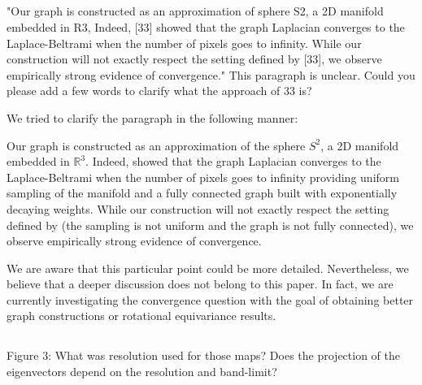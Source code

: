 \documentclass[12pt,a4paper]{article}
\newcommand{\todo}[1]{{\color[rgb]{.6,.1,.6}{TODO: #1}}}
\newcommand{\1}{\b{1}}              %
\newcommand{\0}{\b{0}}              %
\begin{document}
\todo{Assigned to: @all whoever can answer this question. I just do not know the answer.

We clarified the sentence with this:
\begin{mdframed}[style=manuscript]
blabla
\end{mdframed}
}

\subsection{}
\begin{mdframed}[style=comment]
"Our graph is constructed as an approximation of sphere S2, a 2D manifold embedded in R3, Indeed, [33] showed that the graph Laplacian converges to the Laplace-Beltrami when the number of pixels goes to infinity. While our construction will not exactly respect the setting defined by [33], we observe empirically strong evidence of convergence." This paragraph is unclear. Could you please add a few words to clarify what the approach of 33 is?
\end{mdframed}

\todo{Assigned: @nati, @michael}

We tried to clarify the paragraph in the following manner:
\begin{mdframed}[style=manuscript]
Our graph is constructed as an approximation of the sphere $S^2$, a 2D manifold embedded in $\mathbb{R}^3$.
Indeed, \cite{belkin2007convergence} showed that the graph Laplacian converges to the Laplace-Beltrami when the number of pixels goes to infinity providing uniform sampling of the manifold and a fully connected graph built with exponentially decaying weights.
While our construction will not exactly respect the setting defined by \cite{belkin2007convergence} (the sampling is not uniform and the graph is not fully connected), we observe empirically strong evidence of convergence.
\end{mdframed}
We are aware that this particular point could be more detailed. Nevertheless, we believe that a deeper discussion does not belong to this paper. In fact, we are currently investigating the convergence question with the goal of obtaining better graph constructions or rotational equivariance results.

\subsection{}

\begin{mdframed}[style=comment]
Figure 3: What was resolution used for those maps? Does the projection of the eigenvectors depend on the resolution and band-limit?
\end{mdframed}
\end{document}

